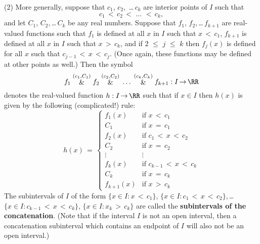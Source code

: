 {\V

        (2) More generally, suppose that $c_{1}$, $c_{2}$, \,{\ldots}\,$c_{k}$ are interior points of $I$ such that
        \begin{displaymath}
        c_{1}\,<\,c_{2}\,<\,\,{\ldots}\,\,<\,c_{k},
        \end{displaymath}
	and let $C_{1}$, $C_{2}$,\,{\ldots}\,$C_{k}$ be any real numbers.
    Suppose that $f_{1}$, $f_{2}$,\,{\ldots}\,$f_{k+1}$ are real-valued functions such that $f_{1}$ is defined at all $x$ in $I$ such that $x\,<\,c_{1}$,
    $f_{k+1}$ is defined at all $x$ in $I$ such that $x\,>\,c_{k}$, and if $2\,\,{\leq}\,\,j\,\,{\leq}\,\,k$ then $f_{j}(x)$ is defined for all $x$ such that $c_{j-1}\,<\,x\,<\,c_{j}$.
    (Once again, these functions may  be defined at other points as well.)
    Then the symbol
        \begin{displaymath}
f_{1}\stackrel{(c_{1},C_{1})}{\&}f_{2}\stackrel{(c_{2},C_{2})}{\&}\,{\ldots}\,\stackrel{(c_{k},C_{k})}{\&}f_{k+1}:I \,{\rightarrow}\, {\RR}
        \end{displaymath}
    denotes the real-valued function $h:I \,{\rightarrow}\, {\RR}$ such that if $x{\in}I$ then $h(x)$ is given by the following (complicated!) rule:
        \begin{displaymath}
        h(x) \,=\, \left\{
        \begin{array}{cl}
        f_{1}(x) & \mbox{if $x\,<\,c_{1}$}             \\
        C_{1}    & \mbox{if $x \,=\, c_{1}$}           \\
        f_{2}(x) & \mbox{if $c_{1}\,<\,x\,<\,c_{2}$}   \\
        C_{2}    & \mbox{if $x \,=\, c_{2}$}           \\
        {\vdots} &        {\vdots}                     \\
        f_{k}(x) & \mbox{if $c_{k-1}\,<\,x\,<\,c_{k}$} \\
        C_{k}    & \mbox{if $x \,=\, c_{k}$}           \\
        f_{k+1}(x) & \mbox{if $x\,>\,c_{k}$}        
        \end{array}
                                \right.
        \end{displaymath}
    The subintervals of $I$ of the form $\{x{\in}I:x\,<\,c_{1}\}$, $\{x{\in}I:c_{1}\,<\,x\,<\,c_{2}\}$,\,{\ldots}\,$\{x{\in}I:c_{k-1}\,<\,x\,<\,c_{k}\}$, $\{x{\in}I: x_{k}\,>\,c_{k}\}$ are called the {\bf subintervals of the concatenation}.
    (Note that if the interval $I$ is not an open interval, then a concatenation subinterval which contains an endpoint of $I$ will also not be an open interval.)

}
